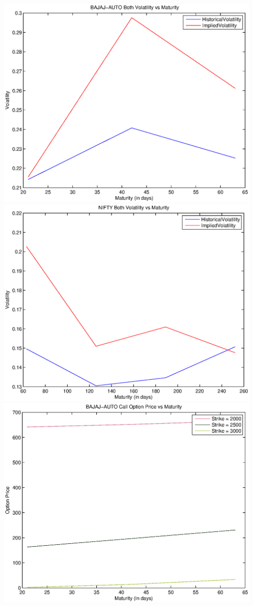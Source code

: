 \documentclass{article}
\begin{document}
\includegraphics[width=\textwidth]{BAJAJ-AUTO_Both_Volatility_vs_Maturity} \\              
\includegraphics[width=\textwidth]{NIFTY_Both_Volatility_vs_Maturity} \\
\includegraphics[width=\textwidth]{BAJAJ-AUTO_Call_Option_Price_vs_Maturity} \\            
\end{document}
